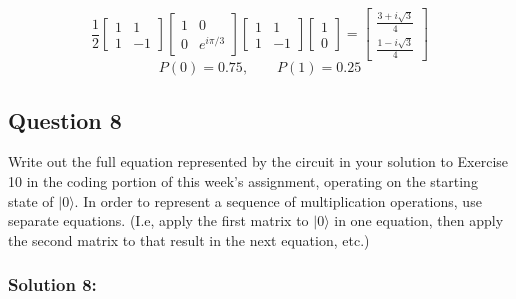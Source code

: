\documentclass{article}
\begin{document}
\[\frac12\begin{bmatrix}1&1\\1&-1\end{bmatrix}\begin{bmatrix}1&0\\0&e^{i\pi/3}\end{bmatrix}\begin{bmatrix}1&1\\1&-1\end{bmatrix}\begin{bmatrix}1\\0\end{bmatrix}=\begin{bmatrix}\frac{3+i\sqrt3}{4}\\\frac{1-i\sqrt3}{4}\end{bmatrix}\]
\[P(0)=0.75,\qquad P(1)=0.25\]


\subsection*{Question 8}

Write out the full equation represented by the circuit in your solution to Exercise 10 in the coding portion of this week's assignment, operating on the starting state of $|0\rangle$. In order to represent a sequence of multiplication operations, use separate equations. (I.e, apply the first matrix to $|0\rangle$ in one equation, then apply the second matrix to that result in the next equation, etc.)

\subsubsection*{Solution 8:}
\end{document}
